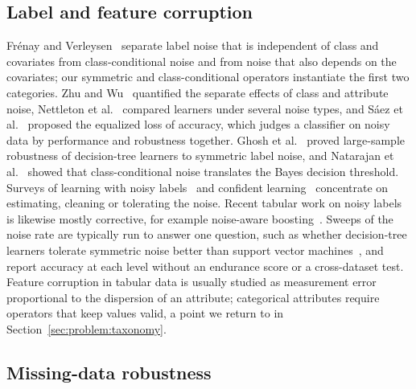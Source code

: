 \documentclass[pdflatex,sn-mathphys]{sn-jnl}
\theoremstyle{thmstyleone}
\theoremstyle{thmstyletwo}
\theoremstyle{thmstylethree}
\begin{document}
\subsection{Label and feature corruption}\label{sec:related:corruption}

Fr\'enay and Verleysen~\cite{frenay2014classification} separate label noise that is independent of class and covariates from class-conditional noise and from noise that also depends on the covariates; our symmetric and class-conditional operators instantiate the first two categories. Zhu and Wu~\cite{zhu2004class} quantified the separate effects of class and attribute noise, Nettleton et al.~\cite{nettleton2010study} compared learners under several noise types, and S\'aez et al.~\cite{saez2015evaluating} proposed the equalized loss of accuracy, which judges a classifier on noisy data by performance and robustness together. Ghosh et al.~\cite{ghosh2017robustness} proved large-sample robustness of decision-tree learners to symmetric label noise, and Natarajan et al.~\cite{natarajan2013learning} showed that class-conditional noise translates the Bayes decision threshold. Surveys of learning with noisy labels~\cite{song2023learning} and confident learning~\cite{northcutt2021confident} concentrate on estimating, cleaning or tolerating the noise. Recent tabular work on noisy labels is likewise mostly corrective, for example noise-aware boosting~\cite{ye2026itboost}. Sweeps of the noise rate are typically run to answer one question, such as whether decision-tree learners tolerate symmetric noise better than support vector machines~\cite{ghosh2017robustness}, and report accuracy at each level without an endurance score or a cross-dataset test. Feature corruption in tabular data is usually studied as measurement error proportional to the dispersion of an attribute; categorical attributes require operators that keep values valid, a point we return to in Section~\ref{sec:problem:taxonomy}.

\subsection{Missing-data robustness}\label{sec:related:missing}
\end{document}
